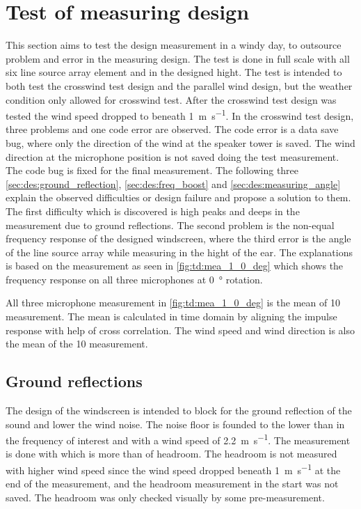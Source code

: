 \section{Test of measuring design}
This section aims to test the design measurement in a windy day, to outsource problem and error in the measuring design. The test is done in full scale with all six line source array element and in the designed hight. The test is intended to both test the crosswind test design and the parallel wind design, but the weather condition only allowed for crosswind test. After the crosswind test design was tested the wind speed dropped to beneath \SI{1}{\meter\per\second}.
In the crosswind test design, three problems and one code error are observed. The code error is a data save bug, where only the direction of the wind at the speaker tower is saved. The wind direction at the microphone position is not saved doing the test measurement. The code bug is fixed for the final measurement. The following three \autoref{sec:des:ground_reflection}, \autoref{sec:des:freq_boost} and \autoref{sec:des:measuring_angle} explain the observed difficulties or design failure and propose a solution to them. The first difficulty which is discovered is high peaks and deeps in the measurement due to ground reflections. The second problem is the non-equal frequency response of the designed windscreen, where the third error is the angle of the line source array while measuring in the hight of the ear.  
The explanations is based on the measurement as seen in \autoref{fig:td:mea_1_0_deg} which shows the frequency response on all three microphones at \SI{0}{\degree} rotation.


All three microphone measurement in \autoref{fig:td:mea_1_0_deg} is the mean of 10 measurement. The mean is calculated in time domain by aligning the impulse response with help of cross correlation. The wind speed and wind direction is also the mean of the 10 measurement.


\subsection{Ground reflections}\label{sec:des:ground_reflection}
The design of the windscreen is intended to block for the ground reflection of the sound and lower the wind noise. The noise floor is founded to the lower than  in the frequency of interest and with a wind speed of \SI{2.2}{\meter\per\second}. The measurement is done with  which is more than  of headroom. The headroom is not measured with higher wind speed since the wind speed dropped beneath  \SI{1}{\meter\per\second} at the end of the measurement, and the headroom measurement in the start was not saved. The headroom was only checked visually by some pre-measurement.

